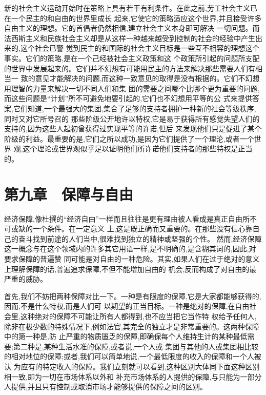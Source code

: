 ﻿\documentclass[12pt]{article}
\begin{document}
新的社会主义运动开始时在策略上具有若干有利条件。在此之前,劳工社会主义已在一个民主的和自由的世界里成长
起来,它使它的策略适应这个世界,并且接受许多自由主义的理想。它的首倡者仍然相信,建立社会主义本身即可解决
一切问题。而法西斯主义和民族社会主义却是从这样一种越来越受到控制的社会的经验中产生出来的,这个社会已警
觉到民主的和国际的社会主义目标是一些互不相容的理想这个事实。它们的策略,是在一个己经被社会主义政策和这
个政策所引起的问题所支配的世界中发展起来的。它们并不幻想有可能用民主的方法来解决那些需要人们有相当一
致的意见才能解决的问题,而这种一致意见的取得是没有根据的。它们不幻想用理智的力量来解决一切不同人们和集
团的需要之间哪个比哪个更为重要的问题,而这些问题是``计划''所不可避免地要引起的,它们也不幻想用平等的公
式来提供答案,它们知道,一个最强大的集团,集合了足够的支持者拥护一种新的社会等级秩序,同时又对它所号召的
那些阶级公开地许以特权,它是易于获得所有感觉失望人们的支持的,因为这些人起初曾获得过实现平等的许诺,但后
来发现他们只是促进了某个阶级的利益。最重要的是,它们之所以成功,是因为它们提供了一个理沦,或者一个世界
观,这个理论或世界观似乎足以证明他们所许诺他们支持者的那些特权是正当的。



\section{第九章　保障与自由}



经济保障,像杜撰的``经济自由''一样而且往往是更有理由被人看成是真正自由所不可或缺的一个条件。在一定意义
上,这是既正确而又重要的。在那些没有信心靠自己的奋斗找到前途的人们当中,很难找到独立的精神或坚强的个性。
然而,经济保障这一概念与在这个领域内的许多其它用语一样,是不明确的,是含糊其词的,因此,对要求保障的普遍赞
同可能是对自由的一种危险。其实,如果人们在过于绝对的意义上理解保障的话,普遍追求保障,不但不能增加自由的
机会,反而构成了对自由的最严重的威胁。

首先,我们不妨把两种保障对比一下。一种是有限度的保障,它是大家都能够获得的,因而,不是什么特权,而是人们可
以期望的正当目标。一种是绝对的保障,在自由社会里,这种绝对的保障不可能让所有人都得到,也不应当把它当作特
权给予任何人,除非在极少数的特殊情况下,例如法官,其完全的独立才是非常重要的。这两种保障中的第一种是,防
止严重的物质匮乏的保障,即确保每个人维持生计的某种最低需要;第二种是,某种生活水准的保障,或者说,一个人或
集团与其他的人或集团相比较的相对地位的保障;或者,我们可以简单地说,一个最低限度的收入的保障和一个人被认
为应有的特定收入的保障。我们立刻就可以看到,这种区别大体同下面这种区别相一致,即为一切在市场体系以外和
补充市场体系的人提供的保障,与只能为一部分人提供,并且只有控制或取消市场才能够提供的保障之间的区别。
\end{document}
